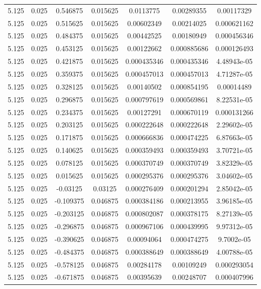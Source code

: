 \begin{flushleft}
\begin{longtable}{ccccccc}
5.125 & 0.025 & 0.546875 & 0.015625 & 0.0113775 & 0.00289355 & 0.00117329  \\ 
5.125 & 0.025 & 0.515625 & 0.015625 & 0.00602349 & 0.00214025 & 0.000621162  \\ 
5.125 & 0.025 & 0.484375 & 0.015625 & 0.00442525 & 0.00180949 & 0.000456346  \\ 
5.125 & 0.025 & 0.453125 & 0.015625 & 0.00122662 & 0.000885686 & 0.000126493  \\ 
5.125 & 0.025 & 0.421875 & 0.015625 & 0.000435346 & 0.000435346 & 4.48943e-05  \\ 
5.125 & 0.025 & 0.359375 & 0.015625 & 0.000457013 & 0.000457013 & 4.71287e-05  \\ 
5.125 & 0.025 & 0.328125 & 0.015625 & 0.00140502 & 0.000854195 & 0.00014489  \\ 
5.125 & 0.025 & 0.296875 & 0.015625 & 0.000797619 & 0.000569861 & 8.22531e-05  \\ 
5.125 & 0.025 & 0.234375 & 0.015625 & 0.00127291 & 0.000670119 & 0.000131266  \\ 
5.125 & 0.025 & 0.203125 & 0.015625 & 0.000222648 & 0.000222648 & 2.29602e-05  \\ 
5.125 & 0.025 & 0.171875 & 0.015625 & 0.000666836 & 0.000474225 & 6.87663e-05  \\ 
5.125 & 0.025 & 0.140625 & 0.015625 & 0.000359493 & 0.000359493 & 3.70721e-05  \\ 
5.125 & 0.025 & 0.078125 & 0.015625 & 0.000370749 & 0.000370749 & 3.82329e-05  \\ 
5.125 & 0.025 & 0.015625 & 0.015625 & 0.000295376 & 0.000295376 & 3.04602e-05  \\ 
5.125 & 0.025 & -0.03125 & 0.03125 & 0.000276409 & 0.000201294 & 2.85042e-05  \\ 
5.125 & 0.025 & -0.109375 & 0.046875 & 0.000384186 & 0.000213955 & 3.96185e-05  \\ 
5.125 & 0.025 & -0.203125 & 0.046875 & 0.000802087 & 0.000378175 & 8.27139e-05  \\ 
5.125 & 0.025 & -0.296875 & 0.046875 & 0.000967106 & 0.000439995 & 9.97312e-05  \\ 
5.125 & 0.025 & -0.390625 & 0.046875 & 0.00094064 & 0.000474275 & 9.7002e-05  \\ 
5.125 & 0.025 & -0.484375 & 0.046875 & 0.000388649 & 0.000388649 & 4.00788e-05  \\ 
5.125 & 0.025 & -0.578125 & 0.046875 & 0.00284178 & 0.00109249 & 0.000293054  \\ 
5.125 & 0.025 & -0.671875 & 0.046875 & 0.00395639 & 0.00248707 & 0.000407996  \\ 

\end{longtable}
\end{flushleft}

